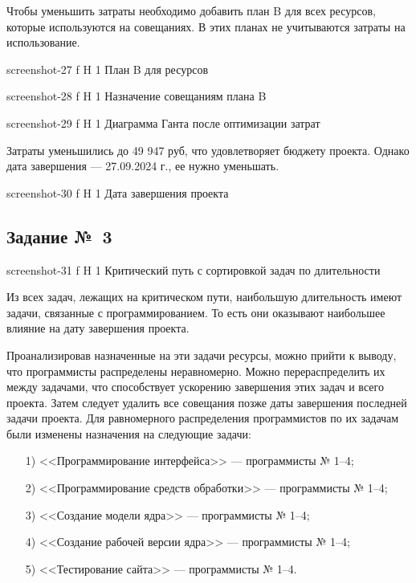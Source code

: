 \documentclass{bmstu}
\begin{document}
Чтобы уменьшить затраты необходимо добавить план B для всех ресурсов, которые используются на совещаниях. 
В этих планах не учитываются затраты на использование.
    
    {screenshot-27}
    {f}
    {H}
    {1\textwidth}
    {План B для ресурсов}
    
    {screenshot-28}
    {f}
    {H}
    {1\textwidth}
    {Назначение совещаниям плана B}
    
    {screenshot-29}
    {f}
    {H}
    {1\textwidth}
    {Диаграмма Ганта после оптимизации затрат}
    
Затраты уменьшились до 49 947 руб, что удовлетворяет бюджету проекта. 
Однако дата завершения --- 27.09.2024 г., ее нужно уменьшать.
    
    {screenshot-30}
    {f}
    {H}
    {1\textwidth}
    {Дата завершения проекта}

\subsection{Задание №~3}

    {screenshot-31}
    {f}
    {H}
    {1\textwidth}
    {Критический путь с сортировкой задач по длительности}

Из всех задач, лежащих на критическом пути, наибольшую длительность имеют задачи, связанные с программированием. 
То есть они оказывают наибольшее влияние на дату завершения проекта.

Проанализировав назначенные на эти задачи ресурсы, можно прийти к выводу, что программисты распределены неравномерно. 
Можно перераспределить их между задачами, что способствует ускорению завершения этих задач и всего проекта. 
Затем следует удалить все совещания позже даты завершения последней задачи проекта. 
Для равномерного распределения программистов по их задачам были изменены назначения на следующие задачи:
\begin{enumerate}
\item[1)] <<Программирование интерфейса>> --- программисты № 1--4;
\item[2)] <<Программирование средств обработки>> --- программисты № 1--4;
\item[3)] <<Создание модели ядра>> --- программисты № 1--4;
\item[4)] <<Создание рабочей версии ядра>> --- программисты № 1--4;
\item[5)] <<Тестирование сайта>> --- программисты № 1--4.
\end{enumerate}
\end{document}
